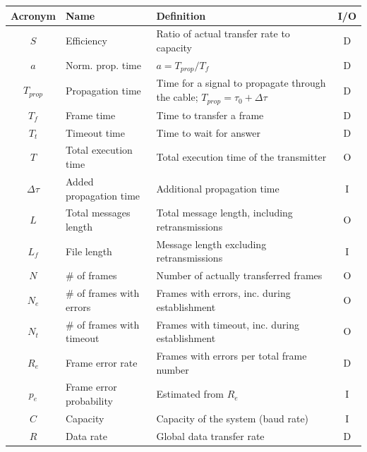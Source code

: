 \documentclass[a4paper, 11pt]{report}
\begin{document}
\begin{center}
	\small
	\begin{tabular}{c | l | p{83mm} | c}
		\hline \hline
		\textbf{Acronym} & \textbf{Name}             & \textbf{Definition}                                                                & I/O \\ \hline
		$S$              & Efficiency                & Ratio of actual transfer rate to capacity                                          & D   \\
		$a$              & Norm. prop. time          & $a = T_{prop}/T_f$                                                                 & D   \\
		$T_{prop}$       & Propagation time          & Time for a signal to propagate through the cable; $T_{prop} = \tau_0 + \Delta\tau$ & D   \\
		$T_f$            & Frame time                & Time to transfer a frame                                                           & D   \\
		$T_t$            & Timeout time              & Time to wait for answer                                                            & D   \\
		$T$              & Total execution time      & Total execution time of the transmitter                                            & O   \\
		$\Delta\tau$     & Added propagation time    & Additional propagation time                                                        & I   \\
		$L$              & Total messages length     & Total message length, including retransmissions                                    & O   \\
		$L_f$            & File length               & Message length excluding retransmissions                                           & I   \\
		$N$				 & \# of frames              & Number of actually transferred frames                                              & O   \\
		$N_e$            & \# of frames with errors  & Frames with errors, inc. during establishment                                      & O   \\
		$N_t$            & \# of frames with timeout & Frames with timeout, inc. during establishment                                     & O   \\
		$R_e$            & Frame error rate          & Frames with errors per total frame number                                          & D   \\
		$p_e$            & Frame error probability   & Estimated from $R_e$                                                               & I   \\
		$C$              & Capacity                  & Capacity of the system (baud rate)                                                 & I   \\
		$R$              & Data rate                 & Global data transfer rate                                                          & D   \\
		\hline \hline
	\end{tabular}
\end{center}
\end{document}
